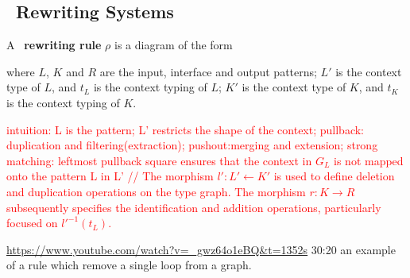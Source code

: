 \documentclass{book}
\begin{document}
    \subsection{\pbpop~Rewriting Systems}
    \begin{definition}
      \label{def:pbpop:rule}
      A \pbpop~\textbf{rewriting rule} \(\rho\) is a diagram of the form
    \begin{center}
    
    \end{center}
    
    \noindent 
    where \(L\), \(K\) and \(R\) are the input, interface and output patterns; \(L'\) is the context type of $L$, and \(t_L\) is the context typing of $L$; \(K'\) is the context type of $K$, and \(t_K\) is the context typing of $K$. 
    \end{definition} 
    \textcolor{red}{intuition:
    L is the pattern; L' restricts the shape of the context; pullback: duplication and filtering(extraction); pushout:merging and extension; strong matching: leftmost pullback square ensures that the context in $G_L$ is not mapped onto the pattern L in L'
    //
    The morphism \(l' : L' \leftarrow K'\) is used to define deletion and duplication operations on the type graph. The morphism \(r : K \to R\) subsequently specifies the identification and addition operations, particularly focused on \(l'^{-1}(t_L)\).
    }
    \begin{example}
        \url{https://www.youtube.com/watch?v=_gwz64o1eBQ&t=1352s} 30:20 an example of a rule which remove a single loop from a graph.
    \end{example}
\end{document}

